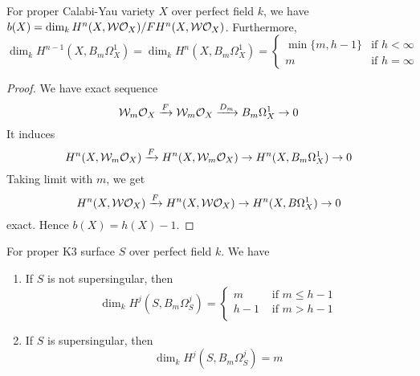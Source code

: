 \documentclass[11pt,a4paper]{scmsnotes}
\begin{document}
\begin{seccor}
For proper Calabi-Yau variety $X$ over perfect field $k$, we have $b(X)= \dim_k H^n(X,\mathcal{W} \mathcal{O}_{X})/F H^n(X,\mathcal{W}\mathcal{O}_{X})$. Furthermore,
\[
\dim_k H^{n-1}(X,B_m \Omega_X^1)=\dim_k H^n(X,B_m \Omega_X^1) = \begin{cases}
\min \{m,h-1\}& \text{if } h < \infty\\
m& \text{if } h = \infty
\end{cases}
\]	
\end{seccor}

\begin{proof}
	We have exact sequence
	\[
	\mathcal{W}_m \mathcal{O}_{X} \xrightarrow{F} \mathcal{W}_m \mathcal{O}_{X} \xrightarrow{D_m} B_m \Omega_X^1 \to 0
	\]
	It induces 
	\[
	H^n(X,\mathcal{W}_m \mathcal{O}_{X}) \xrightarrow{F} H^n(X,\mathcal{W}_m \mathcal{O}_{X}) \to H^n(X,B_m \Omega_X^1) \to 0
	\]
	Taking limit with $m$, we get 
	\[
	H^n(X, \mathcal{W} \mathcal{O}_{X}) \xrightarrow{F} H^n(X,\mathcal{W} \mathcal{O}_{X}) \to H^n(X, B \Omega_X^1) \to 0
	\]
	exact. Hence $b(X)= h(X)-1$. 
\end{proof}
\begin{seccor}
For proper K3 surface $S$ over perfect field $k$. We have
\begin{enumerate}
    \item If $S$ is not supersingular, then 
    \[
\dim_k H^j(S,B_m \Omega_S^j) = \begin{cases} m & \text{ if } m \leq h-1\\
h-1 &\text{ if } m > h-1\\
\end{cases}
\]
    \item If $S$ is supersingular, then
    \[
    \dim_k H^j(S,B_m \Omega_S^j) = m 
    \]
\end{enumerate}

\end{seccor}

\end{document}
